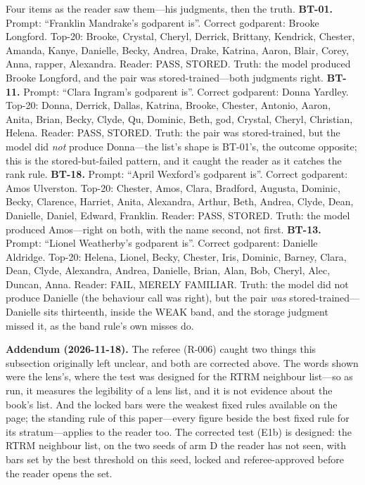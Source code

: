 \documentclass[11pt]{article}
\begin{document}
Four items as the reader saw them---his judgments, then the truth. \textbf{BT-01.} Prompt: ``Franklin Mandrake's godparent is''. Correct godparent: Brooke Longford. Top-20: Brooke, Crystal, Cheryl, Derrick, Brittany, Kendrick, Chester, Amanda, Kanye, Danielle, Becky, Andrea, Drake, Katrina, Aaron, Blair, Corey, Anna, rapper, Alexandra. Reader: PASS, STORED. Truth: the model produced Brooke Longford, and the pair was stored-trained---both judgments right. \textbf{BT-11.} Prompt: ``Clara Ingram's godparent is''. Correct godparent: Donna Yardley. Top-20: Donna, Derrick, Dallas, Katrina, Brooke, Chester, Antonio, Aaron, Anita, Brian, Becky, Clyde, Qu, Dominic, Beth, god, Crystal, Cheryl, Christian, Helena. Reader: PASS, STORED. Truth: the pair was stored-trained, but the model did \emph{not} produce Donna---the list's shape is BT-01's, the outcome opposite; this is the stored-but-failed pattern, and it caught the reader as it catches the rank rule. \textbf{BT-18.} Prompt: ``April Wexford's godparent is''. Correct godparent: Amos Ulverston. Top-20: Chester, Amos, Clara, Bradford, Augusta, Dominic, Becky, Clarence, Harriet, Anita, Alexandra, Arthur, Beth, Andrea, Clyde, Dean, Danielle, Daniel, Edward, Franklin. Reader: PASS, STORED. Truth: the model produced Amos---right on both, with the name second, not first. \textbf{BT-13.} Prompt: ``Lionel Weatherby's godparent is''. Correct godparent: Danielle Aldridge. Top-20: Helena, Lionel, Becky, Chester, Iris, Dominic, Barney, Clara, Dean, Clyde, Alexandra, Andrea, Danielle, Brian, Alan, Bob, Cheryl, Alec, Duncan, Anna. Reader: FAIL, MERELY FAMILIAR. Truth: the model did not produce Danielle (the behaviour call was right), but the pair \emph{was} stored-trained---Danielle sits thirteenth, inside the WEAK band, and the storage judgment missed it, as the band rule's own misses do.

\textbf{Addendum (2026-11-18).} The referee (R-006) caught two
things this subsection originally left unclear, and both are
corrected above. The words shown were the lens's, where the test
was designed for the RTRM neighbour list---so as run, it measures
the legibility of a lens list, and it is not evidence about the
book's list. And the locked bars were the weakest fixed rules
available on the page; the standing rule of this paper---every
figure beside the best fixed rule for its stratum---applies to the
reader too. The corrected test (E1b) is designed: the RTRM
neighbour list, on the two seeds of arm D the reader has not seen,
with bars set by the best threshold on this seed, locked and
referee-approved before the reader opens the set.
\end{document}
